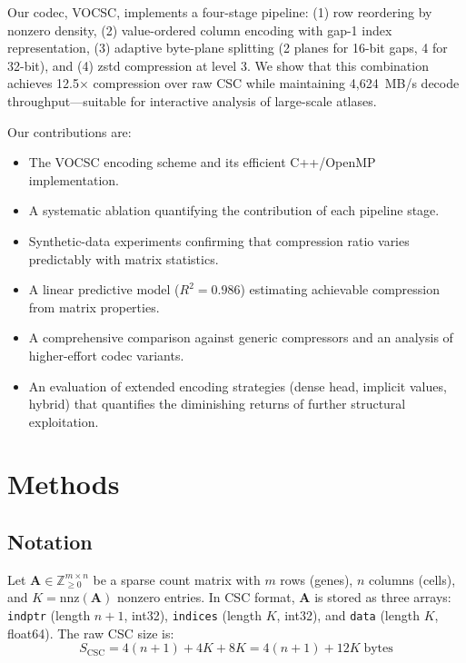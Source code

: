 \documentclass[10pt,twocolumn,letterpaper]{article}
\begin{document}
Our codec, VOCSC, implements a four-stage pipeline: (1) row reordering by nonzero density, (2) value-ordered column encoding with gap-1 index representation, (3) adaptive byte-plane splitting (2 planes for 16-bit gaps, 4 for 32-bit), and (4) zstd compression at level 3.
We show that this combination achieves 12.5$\times$ compression over raw CSC while maintaining 4,624~MB/s decode throughput---suitable for interactive analysis of large-scale atlases.

Our contributions are:
\begin{itemize}
\item The VOCSC encoding scheme and its efficient C++/OpenMP implementation.
\item A systematic ablation quantifying the contribution of each pipeline stage.
\item Synthetic-data experiments confirming that compression ratio varies predictably with matrix statistics.
\item A linear predictive model ($R^2 = 0.986$) estimating achievable compression from matrix properties.
\item A comprehensive comparison against generic compressors and an analysis of higher-effort codec variants.
\item An evaluation of extended encoding strategies (dense head, implicit values, hybrid) that quantifies the diminishing returns of further structural exploitation.
\end{itemize}

\section{Methods}

\subsection{Notation}

Let $\mathbf{A} \in \mathbb{Z}_{\geq 0}^{m \times n}$ be a sparse count matrix with $m$ rows (genes), $n$ columns (cells), and $K = \text{nnz}(\mathbf{A})$ nonzero entries.
In CSC format, $\mathbf{A}$ is stored as three arrays: \texttt{indptr} (length $n+1$, int32), \texttt{indices} (length $K$, int32), and \texttt{data} (length $K$, float64).
The raw CSC size is:
\begin{equation}
S_{\text{CSC}} = 4(n+1) + 4K + 8K = 4(n+1) + 12K \;\text{bytes}
\label{eq:csc_size}
\end{equation}
\end{document}
